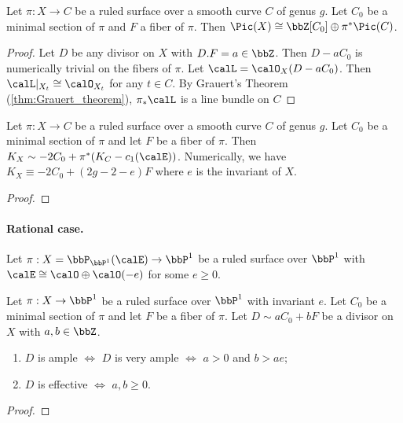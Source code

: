     \begin{proposition}\label{prop:Picard_group_of_ruled_surface}
        Let \(\pi:X \to C\) be a ruled surface over a smooth curve \(C\) of genus \(g\). 
        Let \(C_0\) be a minimal section of \(\pi\) and \(F\) a fiber of \(\pi\). 
        Then \(\Pic(X) \cong \bbZ [C_0] \oplus \pi^*\Pic(C)\).
    \end{proposition}
    \begin{proof}
        Let \(D\) be any divisor on \(X\) with \(D.F = a \in \bbZ\).
        Then \(D - aC_0\) is numerically trivial on the fibers of \(\pi\).
        Let \(\calL = \calO_X(D - aC_0)\).
        Then \(\calL|_{X_t} \cong \calO_{X_t}\) for any \(t \in C\).
        By Grauert's Theorem (\cref{thm:Grauert_theorem}), \(\pi_*\calL\) is a line bundle on \(C\) 
    \end{proof}

    \begin{proposition}\label{prop:canonical_divisor_of_ruled_surface}
        Let \(\pi:X \to C\) be a ruled surface over a smooth curve \(C\) of genus \(g\). 
        Let \(C_0\) be a minimal section of \(\pi\) and let \(F\) be a fiber of \(\pi\). 
        Then \(K_X \sim -2C_0 + \pi^*(K_C-c_1(\calE))\).
        Numerically, we have \(K_X \equiv -2C_0 + (2g-2-e)F\) where \(e\) is the invariant of \(X\).
    \end{proposition}
    \begin{proof}
    \end{proof}

    \paragraph{Rational case.} Let \(\pi:X = \bbP_{\bbP^1}(\calE) \to \bbP^1\) be a ruled surface over \(\bbP^1\) with \(\calE \cong \calO \oplus \calO(-e)\) for some \(e \geq 0\).

    \begin{theorem}\label{thm:positivity_of_divisors_on_rational_ruled_surface}
        Let \(\pi:X \to \bbP^1\) be a ruled surface over \(\bbP^1\) with invariant \(e\).
        Let \(C_0\) be a minimal section of \(\pi\) and let \(F\) be a fiber of \(\pi\). 
        Let \(D \sim aC_0 + bF\) be a divisor on \(X\) with \(a,b \in \bbZ\).
        \begin{enumerate}
            \item \(D\) is ample \(\iff\) \(D\) is very ample \(\iff\) \(a > 0\) and \(b > ae\);
            \item \(D\) is effective \(\iff\) \(a,b \geq 0\).
        \end{enumerate} 
    \end{theorem}
    \begin{proof}
    \end{proof}

